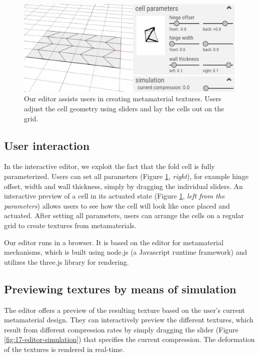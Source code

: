 \begin{figure} [h]  
    \includegraphics[width=\textwidth]{chapters/metamaterial-textures-FIG/16-editor-ui.pdf}
    \caption[Short figure name.]{Our editor assists users in creating metamaterial textures. Users adjust the cell geometry using sliders and lay the cells out on the grid.
    \label{fig:16-editor-ui}}
\end{figure}


\subsection{User interaction}

In the interactive editor, we exploit the fact that the fold cell is fully parameterized. Users can set all parameters (Figure \ref{fig:16-editor-ui}, \textit{right}), for example hinge offset, width and wall thickness, simply by dragging the individual sliders. An interactive preview of a cell in its actuated state (Figure \ref{fig:16-editor-ui}, \textit{left from the parameters}) allows users to see how the cell will look like once placed and actuated. After setting all parameters, users can arrange the cells on a regular grid to create textures from metamaterials. 

Our editor runs in a browser. It is based on the editor for metamaterial mechanisms, which is built using node.js (a Javascript runtime framework) and utilizes the three.js library for rendering. 

\subsection{Previewing textures by means of simulation}

The editor offers a preview of the resulting texture based on the user's current metamaterial design. They can interactively preview the different textures, which result from different compression rates by simply dragging the slider (Figure \ref{fig:17-editor-simulation}) that specifies the current compression. The deformation of the textures is rendered in real-time.

